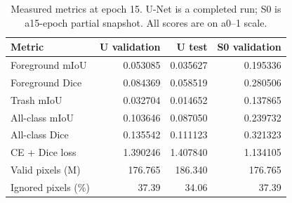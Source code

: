 \begin{table}[H]
\centering\small
\caption{Measured metrics at epoch 15. U-Net is a completed run; S0 is a15-epoch partial snapshot. All scores are on a0--1 scale.}\label{tab:metrics}
\begin{tabular}{lrrr}\toprule
Metric & U validation & U test & S0 validation \\ \midrule
Foreground mIoU & 0.053085 & 0.035627 & 0.195336 \\
Foreground Dice & 0.084369 & 0.058519 & 0.280506 \\
Trash mIoU & 0.032704 & 0.014652 & 0.137865 \\
All-class mIoU & 0.103646 & 0.087050 & 0.239732 \\
All-class Dice & 0.135542 & 0.111123 & 0.321323 \\
CE + Dice loss & 1.390246 & 1.407840 & 1.134105 \\
Valid pixels (M) & 176.765 & 186.340 & 176.765 \\
Ignored pixels (\%) & 37.39 & 34.06 & 37.39 \\
\bottomrule\end{tabular}
\end{table}
